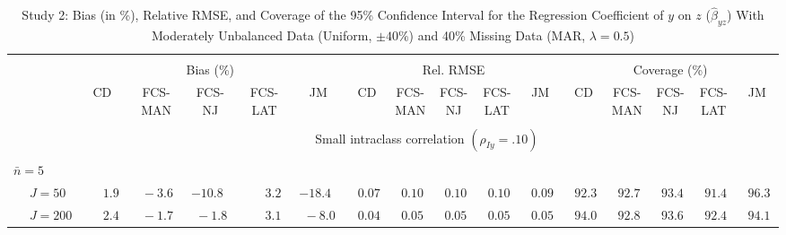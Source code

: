 \begin{sidewaystable}
\begin{threeparttable}
\setlength{\tabcolsep}{1.0pt}
\renewcommand{\arraystretch}{0.95}
\footnotesize
\caption{\small Study 2: Bias (in \%), Relative RMSE, and Coverage of the 95\% Confidence Interval for the Regression Coefficient of $y$ on $z$ ($\hat\beta_{yz}$) With Moderately Unbalanced Data (Uniform, $\pm 40\%$) and 40\% Missing Data (MAR, $\lambda=0.5$)}
\begin{tabular}{llccccccccccccccc}
\hline\\[-1.8ex]
& & \multicolumn{5}{c}{Bias (\%)} & \multicolumn{5}{c}{Rel. RMSE} & \multicolumn{5}{c}{Coverage (\%)} \\ \cmidrule(r){3-7}\cmidrule(r){8-12}\cmidrule(r){13-17}
 &  & CD & \makecell{FCS-\\MAN} & \makecell{FCS-\\NJ} & \makecell{FCS-\\LAT} & JM & CD & \makecell{FCS-\\MAN} & \makecell{FCS-\\NJ} & \makecell{FCS-\\LAT} & JM & CD & \makecell{FCS-\\MAN} & \makecell{FCS-\\NJ} & \makecell{FCS-\\LAT} & \multicolumn{1}{c}{JM} \\ 
[0.4ex]\hline\\[-1.8ex]
& & \multicolumn{15}{c}{Small intraclass correlation $(\rho_{Iy}=.10)$} \\[0.6ex]\hline\\[-1.8ex]
\multicolumn{4}{l}{$\bar{n}=5$} \\  & \nopagebreak $\;J=50$  & $\phantom{0}\phantom{-}1.9\phantom{0}$ & $\phantom{0}{-}3.6\phantom{0}$ & ${-}10.8\phantom{0}$ & $\phantom{0}\phantom{-}3.2\phantom{0}$ & ${-}18.4\phantom{0}$ & $\phantom{0}0.07\phantom{0}$ & $\phantom{0}0.10\phantom{0}$ & $\phantom{0}0.10\phantom{0}$ & $\phantom{0}0.10\phantom{0}$ & $\phantom{0}0.09\phantom{0}$ & $\phantom{0}92.3\phantom{0}$ & $\phantom{0}92.7\phantom{0}$ & $\phantom{0}93.4\phantom{0}$ & $\phantom{0}91.4\phantom{0}$ & $\phantom{0}96.3\phantom{0}$ \\
 & \nopagebreak $\;J=200$  & $\phantom{0}\phantom{-}2.4\phantom{0}$ & $\phantom{0}{-}1.7\phantom{0}$ & $\phantom{0}{-}1.8\phantom{0}$ & $\phantom{0}\phantom{-}3.1\phantom{0}$ & $\phantom{0}{-}8.0\phantom{0}$ & $\phantom{0}0.04\phantom{0}$ & $\phantom{0}0.05\phantom{0}$ & $\phantom{0}0.05\phantom{0}$ & $\phantom{0}0.05\phantom{0}$ & $\phantom{0}0.05\phantom{0}$ & $\phantom{0}94.0\phantom{0}$ & $\phantom{0}92.8\phantom{0}$ & $\phantom{0}93.6\phantom{0}$ & $\phantom{0}92.4\phantom{0}$ & $\phantom{0}94.1\phantom{0}$ \\

\end{tabular}
\end{threeparttable}
\end{sidewaystable}
